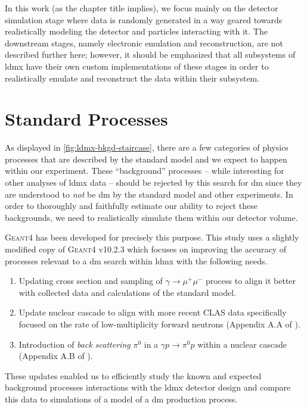 In this work (as the chapter title implies), we focus mainly on the detector simulation stage where data is randomly generated in a way geared towards realistically modeling the detector and particles interacting with it. The downstream stages, namely electronic emulation and reconstruction, are not described further here; however, it should be emphasized that all subsystems of \ac{ldmx} have their own custom implementations of these stages in order to realistically emulate and reconstruct the data within their subsystem.

\section{Standard Processes}
As displayed in \cref{fig:ldmx-bkgd-staircase}, there are a few categories of physics processes that are described by the standard model and we expect to happen within our experiment. These ``background'' processes -- while interesting for other analyses of \ac{ldmx} data -- should be rejected by this search for \ac{dm} since they are understood to \emph{not} be \ac{dm} by the standard model and other experiments. In order to thoroughly and faithfully estimate our ability to reject these backgrounds, we need to realistically simulate them within our detector volume.

\textsc{Geant4} \cite{geant4} has been developed for precisely this purpose. This study uses a slightly modified copy of \textsc{Geant4} v10.2.3 which focuses on improving the accuracy of processes relevant to a \ac{dm} search within \ac{ldmx} with the following needs.
\begin{enumerate}
	\item Updating cross section and sampling of $\gamma\to\mu^+\mu^-$ process to align it better with collected data and calculations of the standard model.
	\item Update nuclear cascade to align with more recent CLAS data specifically focused on the rate of low-multiplicity forward neutrons (Appendix A.A of \cite{ldmx-whitepaper}).
	\item Introduction of \emph{back scattering} $\pi^0$ in a $\gamma p \to \pi^0 p$ within a nuclear cascade (Appendix A.B of \cite{ldmx-whitepaper}).
\end{enumerate}
These updates enabled us to efficiently study the known and expected background processes interactions with the \ac{ldmx} detector design and compare this data to simulations of a model of a \ac{dm} production process.

